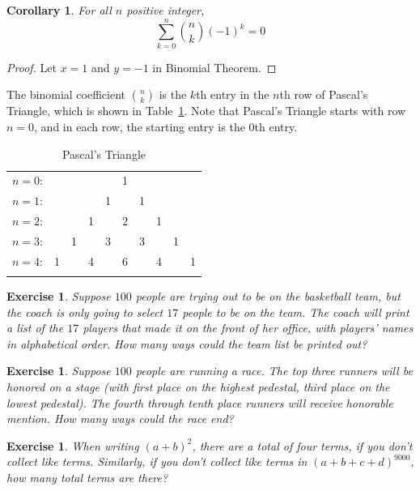\documentclass{book}
\newcounter{ekcounter}%
\theoremstyle{ekimcustom}
\newtheorem{corollary}[ekcounter]{Corollary}
\newtheorem{exercise}[ekcounter]{Exercise}
\begin{document}
\begin{corollary}
For all $n$ positive integer,
\[\sum_{k=0}^n \binom{n}{k}(-1)^k=0\]
\end{corollary}
\begin{proof}
Let $x=1$ and $y=-1$ in Binomial Theorem.
\end{proof}

The binomial coefficient $\binom{n}{k}$ is the $k$th entry in the $n$th row of Pascal's Triangle, which is shown in Table~\ref{table:pascal}. Note that Pascal's Triangle starts with row $n=0$, and in each row, the starting entry is the $0$th entry.
\begin{table}
\begin{center}
\begin{tabular}{rccccccccc}
$n=0$:&    &    &    &    &  1\\\noalign{\smallskip\smallskip}
$n=1$:&    &    &    &  1 &    &  1\\\noalign{\smallskip\smallskip}
$n=2$:&    &    &  1 &    &  2 &    &  1\\\noalign{\smallskip\smallskip}
$n=3$:&    &  1 &    &  3 &    &  3 &    &  1\\\noalign{\smallskip\smallskip}
$n=4$:&  1 &    &  4 &    &  6 &    &  4 &    &  1\\\noalign{\smallskip\smallskip}
\end{tabular}
\caption{Pascal's Triangle}\label{table:pascal}
\end{center}
\end{table}

\begin{exercise}
Suppose $100$ people are trying out to be on the basketball team, but the coach is only going to select $17$ people to be on the team. The coach will print a list of the $17$ players that made it on the front of her office, with players' names in alphabetical order. How many ways could the team list be printed out?
\end{exercise}

\begin{exercise}
Suppose $100$ people are running a race. The top three runners will be honored on a stage (with first place on the highest pedestal, third place on the lowest pedestal). The fourth through tenth place runners will receive honorable mention. How many ways could the race end?
\end{exercise}

\begin{exercise}
When writing $(a+b)^2$, there are a total of four terms, if you don't collect like terms. Similarly, if you don't collect like terms in $(a+b+c+d)^{9000}$, how many total terms are there?
\end{exercise}
\end{document}
